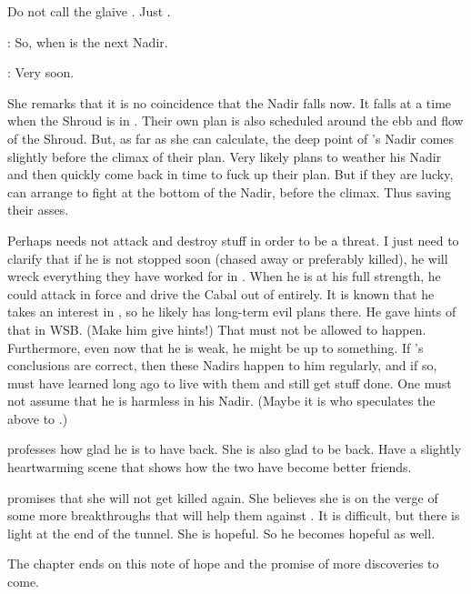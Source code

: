 Do not call the glaive \quo{\Rystessakhin}. 
Just . 

\Teshrial: 
So, when is the next Nadir. 

\Urizeth: 
Very soon. 

She remarks that it is no coincidence that the Nadir falls now.
It falls at a time when the Shroud is in . 
Their own plan is also scheduled around the ebb and flow of the Shroud.
But, as far as she can calculate, the deep point of \Ishnaruchaefir's Nadir comes slightly before the climax of their plan. 
Very likely \Ishnaruchaefir plans to weather his Nadir and then quickly come back in time to fuck up their plan.
But if they are lucky, \Teshrial can arrange to fight \Ishnaruchaefir at the bottom of the Nadir, before the climax.
Thus saving their asses.

Perhaps \Ishnaruchaefir needs not attack and destroy stuff in order to be a threat. 
I just need to clarify that if he is not stopped soon (chased away or preferably killed), he will wreck everything they have worked for in \Malcur.
When he is at his full strength, he could attack in force and drive the Cabal out of \Malcur entirely.
It is known that he takes an interest in \Malcur, so he likely has long-term evil plans there.
He gave hints of that in WSB. (Make him give hints!)
That must not be allowed to happen.
Furthermore, even now that he is weak, he might be up to something.
If \Urizeth's conclusions are correct, then these Nadirs happen to him regularly, and if so, \Ishnaruchaefir must have learned long ago to live with them and still get stuff done.
One must not assume that he is harmless in his Nadir.
(Maybe it is \Azraid who speculates the above to \Teshrial.)

\Teshrial professes how glad he is to have \Urizeth back. 
She is also glad to be back. 
Have a slightly heartwarming scene that shows how the two have become better friends. 

\Urizeth promises that she will not get killed again. 
She believes she is on the verge of some more breakthroughs that will help them against \Ishnaruchaefir. 
It is difficult, but there is light at the end of the tunnel. 
She is hopeful.
So he becomes hopeful as well. 

The chapter ends on this note of hope and the promise of more discoveries to come. 










